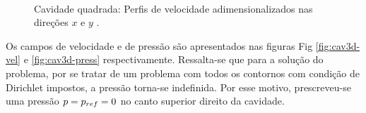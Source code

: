 \documentclass[tese_patricia]{subfiles}%
\begin{document}
\begin{figure}[!t]
	 \\
	\caption{Cavidade quadrada: Perfis de velocidade adimensionalizados nas direções $x$ e $y$ . }
	\label{fig:cavidade_graficos}
\end{figure}

Os campos de velocidade e de pressão são apresentados nas figuras Fig \ref{fig:cav3d-vel} e \ref{fig:cav3d-press} respectivamente. Ressalta-se que para a solução do problema, por se tratar de um problema com todos os contornos com condição de Dirichlet impostos, a pressão torna-se indefinida. Por esse motivo, prescreveu-se uma pressão $p = p_{ref} =  0$ no canto superior direito da cavidade. 
\end{document}
